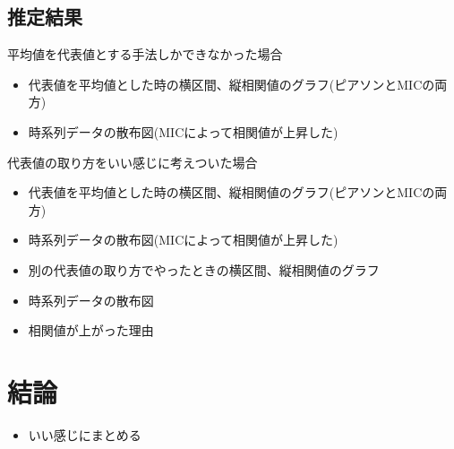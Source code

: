 \section{推定結果}
平均値を代表値とする手法しかできなかった場合
\begin{itemize}
  \item 代表値を平均値とした時の横区間、縦相関値のグラフ(ピアソンとMICの両方)
  \item 時系列データの散布図(MICによって相関値が上昇した)
\end{itemize}

代表値の取り方をいい感じに考えついた場合
\begin{itemize}
  \item 代表値を平均値とした時の横区間、縦相関値のグラフ(ピアソンとMICの両方)
  \item 時系列データの散布図(MICによって相関値が上昇した)
  \item 別の代表値の取り方でやったときの横区間、縦相関値のグラフ
  \item 時系列データの散布図
  \item 相関値が上がった理由
\end{itemize}


\chapter{結論}
\begin{itemize}
  \item いい感じにまとめる
\end{itemize}